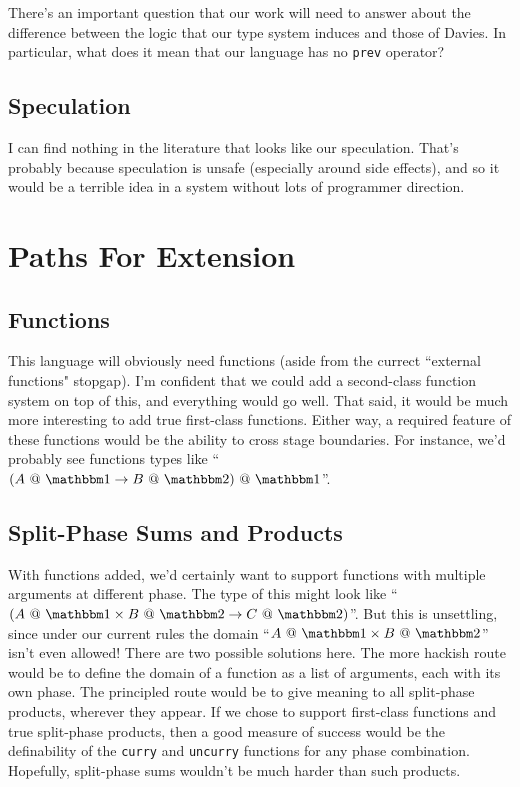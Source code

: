 \documentclass[11pt]{article}
\makeatletter
\newcommand {\bbone} {\mathbbm 1}
\newcommand {\bbtwo} {\mathbbm 2}
\newcommand {\at} {{\tt~@~}}
\makeatother
\begin{document}
There's an important question that our work will need to answer about the difference between the logic that our type system induces and those of Davies.  In particular, what does it mean that our language has no {\tt prev} operator?

\subsection{Speculation}

I can find nothing in the literature that looks like our speculation.  That's probably because speculation is unsafe (especially around side effects), and so it would be a terrible idea in a system without lots of programmer direction.

\section{Paths For Extension}
\label{sec:ext}
\subsection {Functions}
This language will obviously need functions (aside from the currect ``external functions" stopgap).  I'm confident that we could add a second-class function system on top of this, and everything would go well.  That said, it would be much more interesting to add true first-class functions.  Either way, a required feature of these functions would be the ability to cross stage boundaries.  For instance, we'd probably see functions types like ``$(A\at\bbone\to B\at\bbtwo)\at\bbone$''.
\subsection {Split-Phase Sums and Products}
With functions added, we'd certainly want to support functions with multiple arguments at different phase.  The type of this might look like ``$(A\at\bbone \times B\at \bbtwo \to C\at\bbtwo)$''.  But this is unsettling, since under our current rules the domain ``$A\at\bbone \times B\at \bbtwo$'' isn't even allowed!  There are two possible solutions here.  The more hackish route would be to define the domain of a function as a list of arguments, each with its own phase.  The principled route would be to give meaning to all split-phase products, wherever they appear.  If we chose to support first-class functions and true split-phase products, then a good measure of success would be the definability of the {\tt curry} and {\tt uncurry} functions for any phase combination. Hopefully, split-phase sums wouldn't be much harder than such products.  
\end{document}
